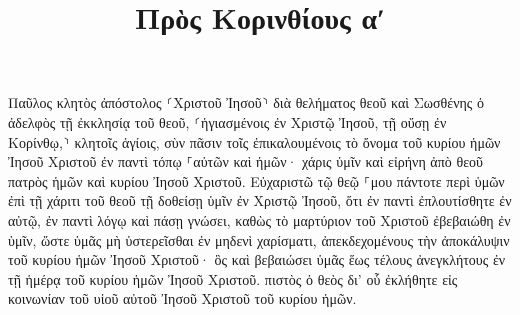 \documentclass{openreader}
\title{Πρὸς Κορινθίους αʹ}
\date{}
\begin{document}
\maketitle
\raggedbottom 
\fontsize{16pt}{24pt}\selectfont


Παῦλος κλητὸς ἀπόστολος ⸂Χριστοῦ Ἰησοῦ⸃ διὰ θελήματος θεοῦ καὶ Σωσθένης ὁ ἀδελφὸς 
τῇ ἐκκλησίᾳ τοῦ θεοῦ, ⸂ἡγιασμένοις ἐν Χριστῷ Ἰησοῦ, τῇ οὔσῃ ἐν Κορίνθῳ,⸃ κλητοῖς ἁγίοις, σὺν πᾶσιν τοῖς ἐπικαλουμένοις τὸ ὄνομα τοῦ κυρίου ἡμῶν Ἰησοῦ Χριστοῦ ἐν παντὶ τόπῳ ⸀αὐτῶν καὶ ἡμῶν· 
χάρις ὑμῖν καὶ εἰρήνη ἀπὸ θεοῦ πατρὸς ἡμῶν καὶ κυρίου Ἰησοῦ Χριστοῦ. 
Εὐχαριστῶ τῷ θεῷ ⸀μου πάντοτε περὶ ὑμῶν ἐπὶ τῇ χάριτι τοῦ θεοῦ τῇ δοθείσῃ ὑμῖν ἐν Χριστῷ Ἰησοῦ, 
ὅτι ἐν παντὶ ἐπλουτίσθητε ἐν αὐτῷ, ἐν παντὶ λόγῳ καὶ πάσῃ γνώσει, 
καθὼς τὸ μαρτύριον τοῦ Χριστοῦ ἐβεβαιώθη ἐν ὑμῖν, 
ὥστε ὑμᾶς μὴ ὑστερεῖσθαι ἐν μηδενὶ χαρίσματι, ἀπεκδεχομένους τὴν ἀποκάλυψιν τοῦ κυρίου ἡμῶν Ἰησοῦ Χριστοῦ· 
ὃς καὶ βεβαιώσει ὑμᾶς ἕως τέλους ἀνεγκλήτους ἐν τῇ ἡμέρᾳ τοῦ κυρίου ἡμῶν Ἰησοῦ Χριστοῦ. 
πιστὸς ὁ θεὸς δι’ οὗ ἐκλήθητε εἰς κοινωνίαν τοῦ υἱοῦ αὐτοῦ Ἰησοῦ Χριστοῦ τοῦ κυρίου ἡμῶν. 
\end{document}
